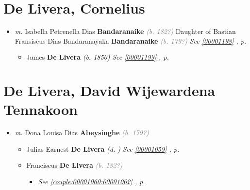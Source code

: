 \documentclass[10pt, openany]{book}
\begin{document}
\chapter{De Livera, Cornelius}
\label{00001196}
\textcolor{slmaroon}{\textit{}}
\begin{itemize}
\item{\textit{m.} Isabella Petrenella Dias \textbf{Bandaranaike} \textcolor{gray}{\textit{(b. 182?)}} Daughter of  Bastian Fransiscus Dias Bandaranayaka \textbf{Bandaranaike} \textcolor{gray}{\textit{(b. 179?)}} \textcolor{slteal}{\textit{See  \autoref{00001198} \textit{, p. \pageref{00001198} }}}   \label{couple:00001196:00001197} \begin{itemize}
\item{James \textbf{De Livera} \textcolor{slorange}{\textit{(b. 1850)}} \textcolor{slteal}{\textit{See  \autoref{00001199} \textit{, p. \pageref{00001199} }}}}
\end{itemize}}
\end{itemize}
  
\chapter{De Livera, David Wijewardena Tennakoon}
\label{00001057}
\textcolor{slmaroon}{\textit{}}
\begin{itemize}
\item{\textit{m.} Dona Louisa Dias \textbf{Abeysinghe} \textcolor{gray}{\textit{(b. 179?)}}   \label{couple:00001057:00001058} \begin{itemize}
\item{Julias Earnest \textbf{De Livera} \textcolor{slorange}{\textit{(d.    )}} \textcolor{slteal}{\textit{See  \autoref{00001059} \textit{, p. \pageref{00001059} }}}}
\item{Franciscus \textbf{De Livera} \textcolor{gray}{\textit{(b. 182?)}}
\begin{itemize}
\item{\textcolor{slteal}{\textit{See  \autoref{couple:00001060:00001062} \textit{, p. \pageref{couple:00001060:00001062} }}}}
\end{itemize}
  }
\end{itemize}}
\end{itemize}
    
\end{document}
